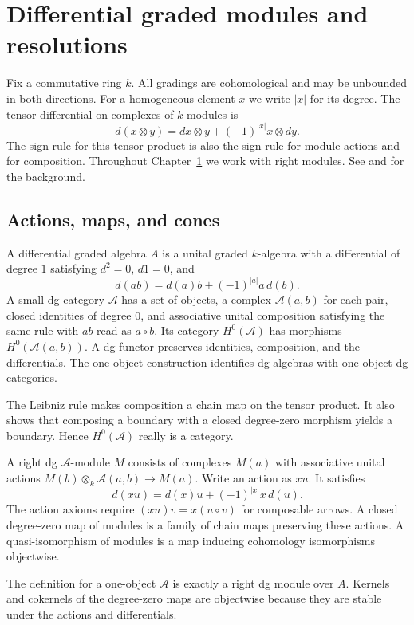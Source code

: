 \chapter{Differential graded modules and resolutions}
\label{ch:dg-modules}

Fix a commutative ring \(k\). All gradings are cohomological and may be
unbounded in both directions. For a homogeneous element \(x\) we write
\(|x|\) for its degree. The tensor differential on complexes of
\(k\)-modules is
\[
 d(x\otimes y)=dx\otimes y+(-1)^{|x|}x\otimes dy .
\]
The sign rule for this tensor product is also the sign rule for module
actions and for composition. Throughout Chapter~\ref{ch:dg-modules}
we work with right modules. See \cite[\S\S2.2, 3.1--3.2]{keller}
and \cite[\S\S3.3--3.4]{yekutieli} for the background.

\section{Actions, maps, and cones}

\begin{definition}\label{res:G01}
A differential graded algebra \(A\) is a unital graded \(k\)-algebra
with a differential of degree \(1\) satisfying \(d^2=0\), \(d1=0\), and
\[
 d(ab)=d(a)b+(-1)^{|a|}a\,d(b).
\]
A small dg category \(\mathcal A\) has a set of objects, a complex
\(\mathcal A(a,b)\) for each pair, closed identities of degree \(0\),
and associative unital composition satisfying the same rule with
\(ab\) read as \(a\circ b\). Its category \(H^0(\mathcal A)\) has morphisms
\(H^0(\mathcal A(a,b))\). A dg functor preserves identities,
composition, and the differentials. The one-object construction
identifies dg algebras with one-object dg categories.
\end{definition}
The Leibniz rule makes composition a chain map on the tensor product.
It also shows that composing a boundary with a closed degree-zero
morphism yields a boundary. Hence \(H^0(\mathcal A)\) really is a category.

\begin{definition}\label{res:G02}
A right dg \(\mathcal A\)-module \(M\) consists of complexes \(M(a)\)
with associative unital actions
\(M(b)\otimes_k\mathcal A(a,b)\to M(a)\). Write an action as \(x u\).
It satisfies
\[
        d(xu)=d(x)u+(-1)^{|x|}x\,d(u).
\]
The action axioms require \((x u)v=x(u\circ v)\) for composable arrows.
A closed degree-zero map of modules is a family of chain maps
preserving these actions. A quasi-isomorphism of modules is a map
inducing cohomology isomorphisms objectwise.
\end{definition}
The definition for a one-object \(\mathcal A\) is exactly a right dg
module over \(A\). Kernels and cokernels of the degree-zero maps are
objectwise because they are stable under the actions and differentials.

